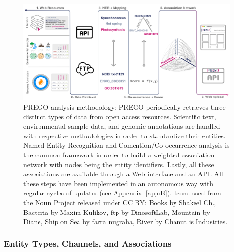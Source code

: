    \begin{figure}[h]
      \centering
      \includegraphics[width=0.98\columnwidth]{figures/prego_analysis_horizontal.png}
      \caption[PREGO analysis methodology]{
         PREGO analysis methodology: PREGO periodically retrieves three distinct types of data from open access resources. 
         Scientific text, environmental sample data, and genomic annotations are handled with respective methodologies in order to standardize their entities. 
         Named Entity Recognition and Comention/Co-occurrence analysis is the common framework in order to build a weighted association network with nodes being the entity identifiers. Lastly, all these associations are available through a Web interface and an API. 
         All these steps have been implemented in an autonomous way with regular cycles of updates (see Appendix~\ref{app:B}). 
         Icons used from the Noun Project released under CC BY: Books by Shakeel Ch., Bacteria by Maxim Kulikov, ftp by DinosoftLab, Mountain by Diane, Ship on Sea by farra nugraha, River by Chanut is Industries.
      }
      \label{fig:prego-pipeline}
   \end{figure}



   \subsubsection*{Entity Types, Channels, and Associations}
   \label{subsec:prego-terms}

